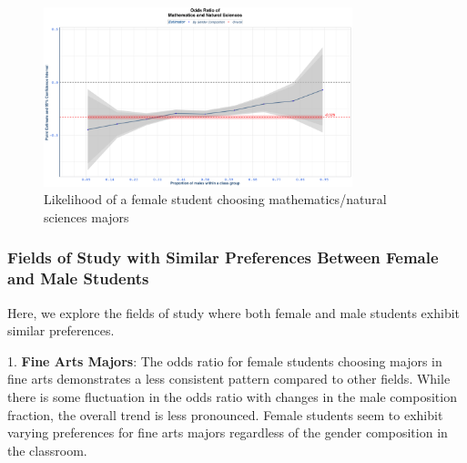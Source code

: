 \begin{figure}[H]
\centering
\includegraphics[width=0.8\textwidth]{Graph/Results/fe_panel_student_gender_composition_wome_in_MATHEMATICS_NATURAL_SCIENCES_bce.png}
\caption{Likelihood of a female student choosing mathematics/natural sciences majors}
\label{fig:math_natural_sciences}
\end{figure}



\subsubsection{Fields of Study  with Similar Preferences Between Female and Male Students}\label{subsec:similar_preference}

Here, we explore the fields of study  where both female and male students exhibit similar preferences.
 

 
1. \textbf{Fine Arts Majors}: The odds ratio for female students choosing majors in fine arts demonstrates a less consistent pattern compared to other fields. While there is some fluctuation in the odds ratio with changes in the male composition fraction, the overall trend is less pronounced. Female students seem to exhibit varying preferences for fine arts majors regardless of the gender composition in the classroom.

